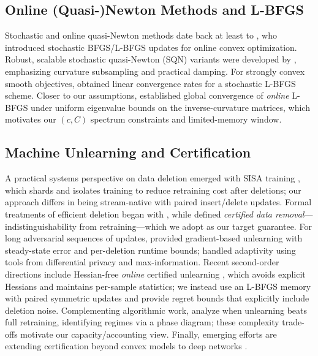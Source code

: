 \documentclass{article}
\theoremstyle{ssltheorem}
\begin{document}
\subsection{Online (Quasi-)Newton Methods and L-BFGS}
Stochastic and online quasi-Newton methods date back at least to \cite{schraudolph2007stochastic}, who introduced stochastic BFGS/L-BFGS updates for online convex optimization.
Robust, scalable stochastic quasi-Newton (SQN) variants were developed by \cite{byrd2016stochastic}, emphasizing curvature subsampling and practical damping.
For strongly convex smooth objectives, \cite{moritz2016linearly} obtained linear convergence rates for a stochastic L-BFGS scheme.
Closer to our assumptions, \cite{mokhtari2015online} established global convergence of \emph{online} L-BFGS under uniform eigenvalue bounds on the inverse-curvature matrices, which motivates our $(c,C)$ spectrum constraints and limited-memory window.
\subsection{Machine Unlearning and Certification}
A practical systems perspective on data deletion emerged with SISA training \cite{bourtoule2021sisa}, which shards and isolates training to reduce retraining cost after deletions;
our approach differs in being stream-native with paired insert/delete updates.
Formal treatments of efficient deletion began with \cite{ginart2019making2}, while \cite{guo2020certified} defined \emph{certified data removal}—indistinguishability from retraining—which we adopt as our target guarantee.
For long adversarial sequences of updates, \cite{neel2021descent} provided gradient-based unlearning with steady-state error and per-deletion runtime bounds;
\cite{gupta2021adaptive} handled adaptivity using tools from differential privacy and max-information.
Recent second-order directions include Hessian-free \emph{online} certified unlearning \cite{qiao2024hessianfree}, which avoids explicit Hessians and maintains per-sample statistics;
we instead use an L-BFGS memory with paired symmetric updates and provide regret bounds that explicitly include deletion noise.
Complementing algorithmic work, \cite{vanwaerebeke2025when} analyze when unlearning beats full retraining, identifying regimes via a phase diagram;
these complexity trade-offs motivate our capacity/accounting view. Finally, emerging efforts are extending certification beyond convex models to deep networks \cite{zhang2024towards}.
\end{document}

